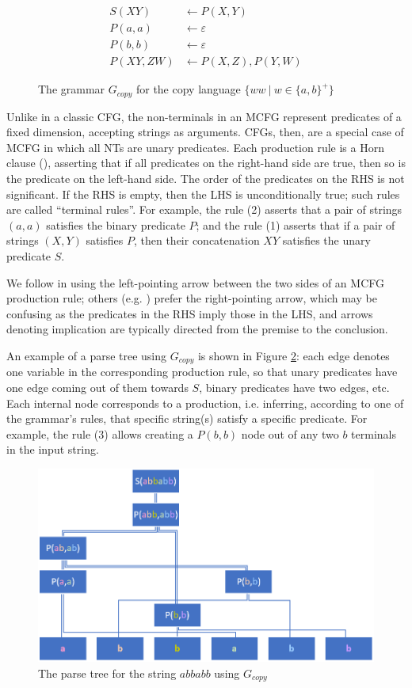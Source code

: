 \documentclass{article}
\begin{document}
\begin{figure}[b]
\begin{align}
S(XY) &\leftarrow P(X,Y) \\
P(a,a) &\leftarrow\varepsilon \\
P(b,b) &\leftarrow\varepsilon \\
P(XY,ZW) &\leftarrow P(X,Z),P(Y,W)
\end{align}
\caption{The grammar $G_{copy}$ for the copy language $\{ww\ |\ w\in\{a,b\}^+\}$}
\label{fig:Gcopy}
\end{figure}

Unlike in a classic CFG, the non-terminals in an MCFG represent predicates of a fixed dimension,
accepting strings as arguments.
CFGs, then, are a special case of MCFG in which all NTs are unary predicates.
Each production rule is a Horn clause (\cite{horn}), asserting that
if all predicates on the right-hand side are true, then so is the predicate on the left-hand side.
The order of the predicates on the RHS is not significant. If the RHS is empty,
then the LHS is unconditionally true; such rules are called ``terminal rules''.
For example, the rule (2) asserts that a pair of strings $(a,a)$ satisfies the binary predicate $P$;
and the rule (1) asserts that if a pair of strings $(X,Y)$ satisfies $P$,
then their concatenation $XY$ satisfies the unary predicate $S$.

We follow \cite{clark} in using the left-pointing arrow
between the two sides of an MCFG production rule;
others (e.g. \cite{kallmeyer}) prefer the right-pointing arrow,
which may be confusing as the predicates in the RHS imply those in the LHS,
and arrows denoting implication are typically directed from the premise to the conclusion.

An example of a parse tree using $G_{copy}$ is shown in Figure \ref{fig:parse}:
each edge denotes one variable in the corresponding production rule,
so that unary predicates have one edge coming out of them towards $S$,
binary predicates have two edges, etc. Each internal node corresponds to a production,
i.e. inferring, according to one of the grammar's rules,
that specific string(s) satisfy a specific predicate.
For example, the rule (3) allows creating a $P(b,b)$ node out of any two $b$ terminals in the input string.

\begin{figure}[t]
\includegraphics[width=\textwidth]{parse.png}
\caption{The parse tree for the string $abbabb$ using $G_{copy}$}
\label{fig:parse}
\end{figure}
\end{document}
